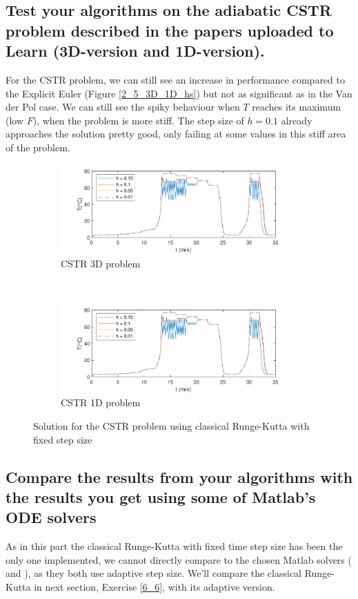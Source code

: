 \subsection{Test  your  algorithms  on  the  adiabatic  CSTR  problem  described  in  the
papers uploaded to Learn (3D-version and 1D-version).}
For the CSTR problem, we can still see an increase in performance compared to the Explicit Euler (Figure \ref{2_5_3D_1D_hs}) but not as significant as in the Van der Pol case. We can still see the spiky behaviour when $T$ reaches its maximum (low $F$), when the problem is more stiff. The step size of $h=0.1$ already approaches the solution pretty good, only failing at some values in this stiff area of the problem.
\begin{figure}[H]
\centering
    \begin{subfigure}{0.8\linewidth}
        \centering
        \includegraphics[width=1\linewidth]{images/5/5_5_CSTR_3D.pdf} 
        \caption{CSTR 3D problem}
    \end{subfigure} \\
    \begin{subfigure}{0.8\linewidth}
        \centering
        \includegraphics[width=1\linewidth]{images/5/5_5_CSTR_1D.pdf}
        \caption{CSTR 1D problem}
    \end{subfigure}
    \caption{Solution for the CSTR problem using classical Runge-Kutta with fixed step size}
    \label{5_5_3D_1D}
\end{figure}

\subsection{Compare the results from your algorithms with the results you get using some of Matlab's ODE solvers}
As in this part the classical Runge-Kutta with fixed time step size has been the only one implemented, we cannot directly compare to the chosen Matlab solvers ( and ), as they both use adaptive step size. We'll compare the classical Runge-Kutta in next section, Exercise \ref{6_6}, with its adaptive version.
